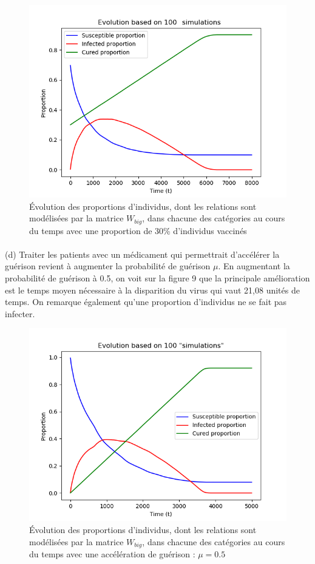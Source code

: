 \documentclass[a4paper, 12pt, oneside]{article}
\begin{document}
\begin{figure}[H]
	\centering
	\includegraphics[scale=1]{Wbig_dense_initial_immunised.png} 
	\caption{Évolution des proportions d'individus, dont les relations sont modélisées par la matrice $W_{big}$, dans chacune des catégories au cours du temps avec une proportion de 30\% d'individus vaccinés}
\end{figure}

\paragraph{}(d) Traiter les patients avec un médicament qui permettrait d'accélérer la guérison revient à augmenter la probabilité de guérison $\mu$. En augmentant la probabilité de guérison à 0.5, on voit sur la figure 9 que la principale amélioration est le temps moyen nécessaire à la disparition du virus qui vaut 21,08 unités de temps. On remarque également qu'une proportion d'individus ne se fait pas infecter.

\begin{figure}[H]
	\centering
	\includegraphics[scale=1]{Wbig_dense_speeded_heal.png} 
	\caption{Évolution des proportions d'individus, dont les relations sont modélisées par la matrice $W_{big}$, dans chacune des catégories au cours du temps avec une accélération de guérison : $\mu = 0.5$}
\end{figure}
\end{document}
